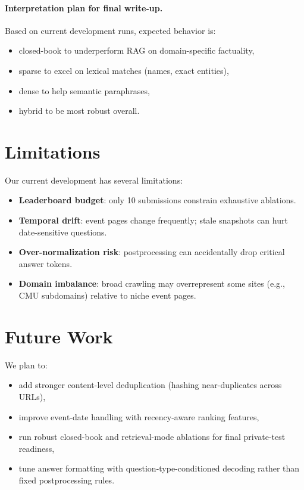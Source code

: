 \documentclass[11pt,twocolumn]{article}
\begin{document}
\paragraph{Interpretation plan for final write-up.}
Based on current development runs, expected behavior is:
\begin{itemize}
    \item closed-book to underperform RAG on domain-specific factuality,
    \item sparse to excel on lexical matches (names, exact entities),
    \item dense to help semantic paraphrases,
    \item hybrid to be most robust overall.
\end{itemize}

\section{Limitations}
Our current development has several limitations:
\begin{itemize}
    \item \textbf{Leaderboard budget}: only 10 submissions constrain exhaustive ablations.
    \item \textbf{Temporal drift}: event pages change frequently; stale snapshots can hurt date-sensitive questions.
    \item \textbf{Over-normalization risk}: postprocessing can accidentally drop critical answer tokens.
    \item \textbf{Domain imbalance}: broad crawling may overrepresent some sites (e.g., CMU subdomains) relative to niche event pages.
\end{itemize}

\section{Future Work}
We plan to:
\begin{itemize}
    \item add stronger content-level deduplication (hashing near-duplicates across URLs),
    \item improve event-date handling with recency-aware ranking features,
    \item run robust closed-book and retrieval-mode ablations for final private-test readiness,
    \item tune answer formatting with question-type-conditioned decoding rather than fixed postprocessing rules.
\end{itemize}
\end{document}
